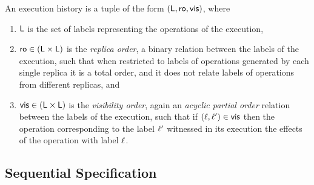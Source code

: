 \begin{definition}[histories]
  \label{definition:histories} An execution history is a tuple of the form
  $(\mathsf{L}, \mathsf{ro}, \mathsf{vis})$, where
  \begin{enumerate}
  \item $\mathsf{L}$ is the set of labels representing the operations of
    the execution,
  \item $\mathsf{ro} \in (\mathsf{L} \times \mathsf{L})$ is the
    \emph{replica order}, a binary relation between the labels of the
    execution, such that when restricted to labels of operations generated
    by each single replica it is a total order, and it does not relate labels of
    operations from different replicas, and
  \item $\mathsf{vis} \in (\mathsf{L} \times \mathsf{L})$ is the
    \emph{visibility order}, again an \emph{acyclic partial order}
    relation between the labels of the execution, such that if $(\ell,
    \ell') \in \mathsf{vis}$ then the operation corresponding to the label
    $\ell'$ witnessed in its execution the effects of the operation
    with label $\ell$.
  \end{enumerate}
\end{definition}


\subsection{Sequential Specification}
\label{subsec:sequential specification}

